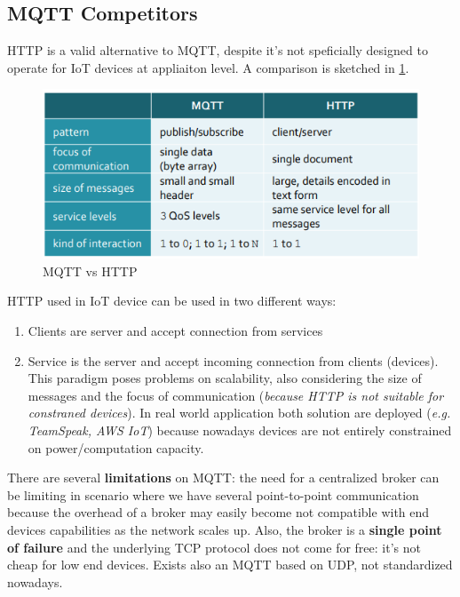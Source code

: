 \documentclass[10pt,a4paper]{report}
\theoremstyle{definition}
\begin{document}
\subsection{MQTT Competitors}\label{sec:mqtt-competitors}
HTTP is a valid alternative to MQTT, despite it's not speficially designed to operate for IoT devices at appliaiton level. A comparison is sketched in \ref{mqtt-vs-http}.
\begin{figure}[h!]
	\centering\includegraphics[scale=0.70]{images/Pasted image 20230307112648.png}
	\caption{MQTT vs HTTP}\label{mqtt-vs-http}\end{figure}

HTTP used in IoT device can be used in two different ways:
\begin{enumerate}
	\item 
	Clients are server and accept connection from services
	\item 
	Service is the server and accept incoming connection from clients (devices). 	This paradigm poses problems on scalability, also considering the size of messages and the focus of communication (\textit{because HTTP is not suitable for constraned devices}).
	In real world application both solution are deployed (\textit{e.g. TeamSpeak, AWS IoT}) because nowadays devices are not entirely constrained on power/computation capacity.
\end{enumerate}

There are several \textbf{limitations} on MQTT: the need for a centralized broker can be limiting in scenario where we have several point-to-point communication because the overhead of a broker may easily become not compatible with end devices capabilities as the network scales up. Also, the broker is a \textbf{single point of failure} and the underlying TCP protocol does not come for free: it's not cheap for low end devices. Exists also an MQTT based on UDP, not standardized nowadays.
\end{document}
